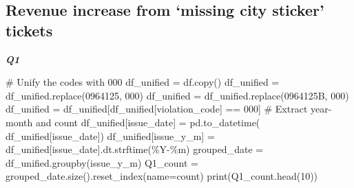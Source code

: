 \documentclass[
  letterpaper,
  DIV=11,
  numbers=noendperiod]{scrartcl}
\newenvironment{Shaded}{\begin{snugshade}}{\end{snugshade}}
\newcommand{\BuiltInTok}[1]{\textcolor[rgb]{0.00,0.23,0.31}{#1}}
\newcommand{\CommentTok}[1]{\textcolor[rgb]{0.37,0.37,0.37}{#1}}
\newcommand{\DecValTok}[1]{\textcolor[rgb]{0.68,0.00,0.00}{#1}}
\newcommand{\NormalTok}[1]{\textcolor[rgb]{0.00,0.23,0.31}{#1}}
\newcommand{\OperatorTok}[1]{\textcolor[rgb]{0.37,0.37,0.37}{#1}}
\newcommand{\StringTok}[1]{\textcolor[rgb]{0.13,0.47,0.30}{#1}}
\begin{document}
\subsection{Revenue increase from `missing city sticker'
tickets}\label{revenue-increase-from-missing-city-sticker-tickets}

\textbf{\emph{Q1}}

\begin{Shaded}
\begin{Highlighting}[]
\CommentTok{\# Unify the codes with 000}
\NormalTok{df\_unified }\OperatorTok{=}\NormalTok{ df.copy()}
\NormalTok{df\_unified }\OperatorTok{=}\NormalTok{  df\_unified.replace(}\StringTok{\textquotesingle{}0964125\textquotesingle{}}\NormalTok{, }\StringTok{\textquotesingle{}000\textquotesingle{}}\NormalTok{)}
\NormalTok{df\_unified }\OperatorTok{=}\NormalTok{  df\_unified.replace(}\StringTok{\textquotesingle{}0964125B\textquotesingle{}}\NormalTok{, }\StringTok{\textquotesingle{}000\textquotesingle{}}\NormalTok{)}
\NormalTok{df\_unified }\OperatorTok{=}\NormalTok{ df\_unified[df\_unified[}\StringTok{\textquotesingle{}violation\_code\textquotesingle{}}\NormalTok{] }\OperatorTok{==} \StringTok{\textquotesingle{}000\textquotesingle{}}\NormalTok{]}
\CommentTok{\# Extract year{-}month and count}
\NormalTok{df\_unified[}\StringTok{\textquotesingle{}issue\_date\textquotesingle{}}\NormalTok{] }\OperatorTok{=}\NormalTok{ pd.to\_datetime(}
\NormalTok{df\_unified[}\StringTok{\textquotesingle{}issue\_date\textquotesingle{}}\NormalTok{])}
\NormalTok{df\_unified[}\StringTok{\textquotesingle{}issue\_y\_m\textquotesingle{}}\NormalTok{] }\OperatorTok{=}\NormalTok{ df\_unified[}\StringTok{\textquotesingle{}issue\_date\textquotesingle{}}\NormalTok{].dt.strftime(}\StringTok{\textquotesingle{}\%Y{-}\%m\textquotesingle{}}\NormalTok{)}
\NormalTok{grouped\_date }\OperatorTok{=}\NormalTok{ df\_unified.groupby(}\StringTok{\textquotesingle{}issue\_y\_m\textquotesingle{}}\NormalTok{)}
\NormalTok{Q1\_count }\OperatorTok{=}\NormalTok{ grouped\_date.size().reset\_index(name}\OperatorTok{=}\StringTok{\textquotesingle{}count\textquotesingle{}}\NormalTok{)}
\BuiltInTok{print}\NormalTok{(Q1\_count.head(}\DecValTok{10}\NormalTok{))}


\end{Highlighting}
\end{Shaded}
\end{document}
